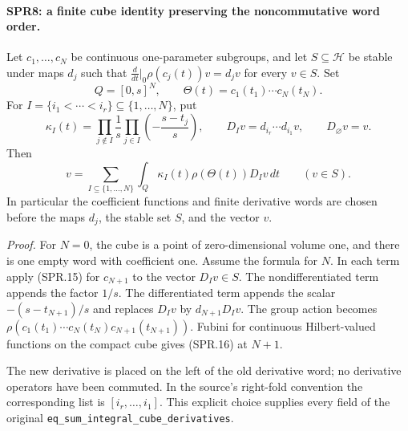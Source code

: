 \documentclass[11pt,a4paper]{article}
\numberwithin{equation}{section}
\theoremstyle{remark}\newtheorem{remark}[theorem]{Remark}
\begin{document}
\paragraph{SPR8: a finite cube identity preserving the noncommutative word order.}
\label{claim:SPR8}
Let \(c_1,\ldots,c_N\) be continuous one-parameter subgroups,
and let \(S\subseteq\mathcal H\) be stable under maps \(d_j\)
such that
\(\frac{d}{dt}|_0\rho(c_j(t))v=d_jv\) for every \(v\in S\).
Set
\[
 Q=[0,s]^N,\qquad
       \Theta(t)=c_1(t_1)\cdots c_N(t_N).
\]
For \(I=\{i_1<\cdots<i_r\}\subseteq\{1,\ldots,N\}\), put
\[
 \kappa_I(t)=
   \prod_{j\notin I}\frac1s
   \prod_{j\in I}\left(-\frac{s-t_j}{s}\right),
 \qquad D_Iv=d_{i_r}\cdots d_{i_1}v,\qquad D_\varnothing v=v.
\]
Then
\[
             v=\sum_{I\subseteq\{1,\ldots,N\}}
                  \int_Q\kappa_I(t)\rho(\Theta(t))D_Iv\,dt
                     \qquad(v\in S).
 \tag{SPR.16}
\]
In particular the coefficient functions and finite derivative
words are chosen before the maps \(d_j\), the stable set \(S\),
and the vector \(v\).

\emph{Proof.}
For \(N=0\), the cube is a point of zero-dimensional volume one,
and there is one empty word with coefficient one.
Assume the formula for \(N\).  In each term apply (SPR.15)
for \(c_{N+1}\) to the vector \(D_Iv\in S\).
The nondifferentiated term appends the factor \(1/s\).
The differentiated term appends the scalar
\(-(s-t_{N+1})/s\) and replaces \(D_Iv\) by
\(d_{N+1}D_Iv\).
The group action becomes
\(\rho(c_1(t_1)\cdots c_N(t_N)c_{N+1}(t_{N+1}))\).
Fubini for continuous Hilbert-valued functions on the compact cube
gives (SPR.16) at \(N+1\).

The new derivative is placed on the left of the old derivative
word; no derivative operators have been commuted.  In the source's
right-fold convention the corresponding list is
\([i_r,\ldots,i_1]\).
This explicit choice supplies every field of the original
\texttt{eq\_\allowbreak sum\_\allowbreak integral\_\allowbreak cube\_\allowbreak derivatives}.


\end{document}
